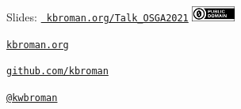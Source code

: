 \documentclass[aspectratio=169,12pt,t]{beamer}
\begin{document}
\begin{frame}[c]{}

\Large

Slides: \href{https://kbroman.org/Talk_OSGA2021}{\tt
  kbroman.org/Talk\_OSGA2021} \quad
\includegraphics[height=5mm]{Figs/cc-zero.png}

\vspace{7mm}

\href{https://kbroman.org}{\tt \lolit kbroman.org}

\vspace{7mm}

\href{https://github.com/kbroman}{\tt \lolit github.com/kbroman}

\vspace{7mm}

\href{https://twitter.com/kwbroman}{\tt \lolit @kwbroman}


\end{frame}
\end{document}
